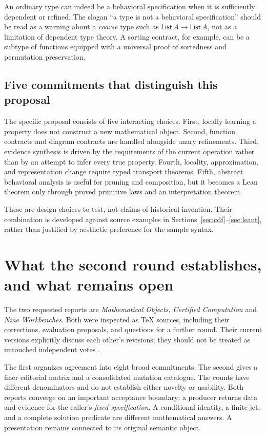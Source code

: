 \documentclass[11pt,a4paper]{article}
\theoremstyle{plain}
\theoremstyle{definition}
\theoremstyle{remark}
\begin{document}
An ordinary type can indeed be a behavioral specification when it is sufficiently
dependent or refined. The slogan ``a type is not a behavioral specification''
should be read as a warning about a \emph{coarse} type such as
$\mathsf{List}\,A\to\mathsf{List}\,A$, not as a limitation of dependent type
theory. A sorting contract, for example, can be a subtype of functions equipped
with a universal proof of sortedness and permutation preservation.

\subsection{Five commitments that distinguish this proposal}
The specific proposal consists of five interacting choices. First, locally
learning a property does not construct a new mathematical object. Second,
function contracts and diagram contracts are handled alongside unary
refinements. Third, evidence synthesis is driven by the requirements of the
current operation rather than by an attempt to infer every true property.
Fourth, locality, approximation, and representation change require typed
transport theorems. Fifth, abstract behavioral analysis is useful for pruning
and composition, but it becomes a Lean theorem only through proved primitive
laws and an interpretation theorem.

These are design choices to test, not claims of historical invention. Their
combination is developed against source examples in
Sections~\ref{sec:cdf}--\ref{sec:leant}, rather than justified by aesthetic
preference for the sample syntax.

\section{What the second round establishes, and what remains open}
\label{sec:roundtwo}
The two requested reports are \emph{Mathematical Objects, Certified
Computation} and \emph{Nine Workbenches}. Both were inspected as TeX sources,
including their corrections, evaluation proposals, and questions for a further
round. Their current versions explicitly discuss each other's revisions; they
should not be treated as untouched independent votes \cite{synthesis,workbenches}.

The first organizes agreement into eight broad commitments. The second gives a
finer editorial matrix and a consolidated mutation catalogue. The counts have
different denominators and do not establish either novelty or usability. Both
reports converge on an important acceptance boundary: a producer returns data
and evidence for the caller's \emph{fixed specification}. A conditional identity,
a finite jet, and a complete solution predicate are different mathematical
answers. A presentation remains connected to its original semantic object.
\end{document}
